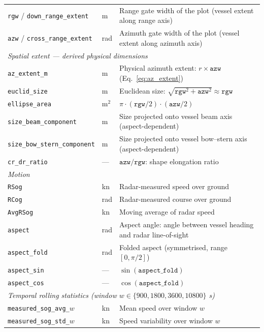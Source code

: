 \documentclass[12pt, a4paper]{article}
\begin{document}
\begin{table}[H]
\begin{tabular}{llp{7cm}}
\texttt{rgw} / \texttt{down\_range\_extent}  & m  & Range gate width of the plot (vessel extent along range axis) \\
\texttt{azw} / \texttt{cross\_range\_extent} & rad & Azimuth gate width of the plot (vessel extent along azimuth axis) \\
\midrule
\multicolumn{3}{l}{\textit{Spatial extent — derived physical dimensions}} \\
\texttt{az\_extent\_m}      & m           & Physical azimuth extent: $r \times \texttt{azw}$ (Eq.~\ref{eq:az_extent}) \\
\texttt{euclid\_size}       & m           & Euclidean size: $\sqrt{\texttt{rgw}^2 + \texttt{azw}^2} \approx \texttt{rgw}$ \\
\texttt{ellipse\_area}      & m$^2$       & $\pi \cdot (\texttt{rgw}/2) \cdot (\texttt{azw}/2)$ \\
\texttt{size\_beam\_component}     & m   & Size projected onto vessel beam axis (aspect-dependent) \\
\texttt{size\_bow\_stern\_component} & m & Size projected onto vessel bow–stern axis (aspect-dependent) \\
\texttt{cr\_dr\_ratio}      & —           & $\texttt{azw} / \texttt{rgw}$: shape elongation ratio \\
\midrule
\multicolumn{3}{l}{\textit{Motion}} \\
\texttt{RSog}               & kn          & Radar-measured speed over ground \\
\texttt{RCog}               & rad         & Radar-measured course over ground \\
\texttt{AvgRSog}            & kn          & Moving average of radar speed \\
\texttt{aspect}             & rad         & Aspect angle: angle between vessel heading and radar line-of-sight \\
\texttt{aspect\_fold}       & rad         & Folded aspect (symmetrised, range $[0, \pi/2]$) \\
\texttt{aspect\_sin}        & —           & $\sin(\texttt{aspect\_fold})$ \\
\texttt{aspect\_cos}        & —           & $\cos(\texttt{aspect\_fold})$ \\
\midrule
\multicolumn{3}{l}{\textit{Temporal rolling statistics (window $w \in \{900, 1800, 3600, 10800\}$ s)}} \\
\texttt{measured\_sog\_avg\_$w$}    & kn  & Mean speed over window $w$ \\
\texttt{measured\_sog\_std\_$w$}    & kn  & Speed variability over window $w$ \\

\end{tabular}
\end{table}
\end{document}
